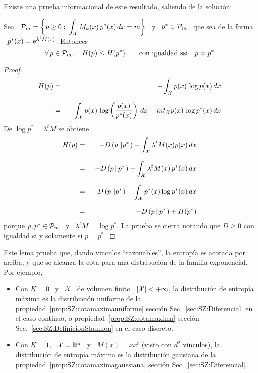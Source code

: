 Existe una prueba informacional de este resultado, saliendo de la soluci\'on:
%
\begin{lema}
  Sea \ $\displaystyle \P_m = \left\{ p \ge 0: \: \int_\X M_k(x) \, p^*(x) \, dx
    =  m \right\}$ \  y \  $p^* \in  \P_m$ \  que sea  de la  forma \  $p^*(x) =
  \e^{\lambda^t M(x)}$. Entonces
  \[
  \forall \,  p \in \P_m, \quad  H(p) \le H(p^*) \qquad  \mbox{con igualdad ssi}
  \quad p = p^*
  \]
\end{lema}
\begin{proof}
\begin{eqnarray*}
H(p) & = & - \int_\X p(x) \, \log p(x) \, dx\\[2.5mm]
%
& = & - \int_\X p(x) \, \log\left( \frac{p(x)}{p^*(x)} \right) \, dx - int_\X
p(x) \, \log p^*(x) \, dx
\end{eqnarray*}
%
De $\log p^* = \lambda^t M$ se obtiene
%
\begin{eqnarray*}
H(p) & = & - D\left( p \left\| p^* \right. \right) - \int_\X \lambda^t M(x) p(x)
\, dx\\[2.5mm]
%
& = & - D\left( p \left\| p^* \right. \right) - \int_\X \lambda^t M(x) \, p^*(x)
\, dx\\[2.5mm]
%
& = & - D\left( p \left\| p^* \right. \right) - \int_\X p^*(x) \log p^*(x) \,
dx\\[2.5mm]
%
& = & - D\left( p \left\| p^* \right. \right) + H(p^*)
\end{eqnarray*}
%
porque $p,  p^* \in \P_m$ \  y \ $\lambda^t M  = \log p^*$. La  prueba se cierra
notando que $D \ge 0$ con igualdad si y solamente si $p = p^*$.
\end{proof}
%
Este lema prueba que, dando  vinculos ``razonables'', la entrop\'ia es acotada por
arriba,  y  que  se alcanza  la  cota  para  una  distribuci\'on de  la  familia
exponencial. Por ejemplo,
%
\begin{itemize}
\item Con  $K =  0$ \  y \  $\X$ \ de  volumen finito  \ $|\X|  < +  \infty$, la
  distribuci\'on  de entrop\'ia  m\'axima es  la distribuci\'on  uniforme  de la
  propiedad~\ref{prop:SZ:cotamaximauniforme}                            secci\'on
  Sec.~\ref{sec:SZ:Diferencial}      en       el      caso      continuo,      o
  propiedad~\ref{prop:SZ:cotamaxima}                                    secci\'on
  Sec.~\ref{sec:SZ:DefinicionShannon} en el caso discreto.
%
\item Con  $K =  1$, \ $\X  = \Rset^d$  \ y \  $M(x) = x  x^t$ (visto  con $d^2$
  vinculos),  la  distribuci\'on de  entrop\'ia  m\'axima  es la  distribuci\'on
  gausiana    de   la    propiedad~\ref{prop:SZ:cotamaximagaussiana}   secci\'on
  Sec.~\ref{sec:SZ:Diferencial}.
\end{itemize}


